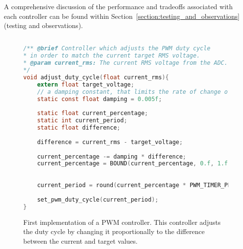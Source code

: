 A comprehensive discussion of the performance and tradeoffs associated with each controller can be found within Section~\ref{section:testing_and_observations} (testing and observations).

\begin{figure}[h]
\begin{lstlisting}[language=C, frame=single, basicstyle=\small, tabsize=2]

/** @brief Controller which adjusts the PWM duty cycle
* in order to match the current target RMS voltage.
* @param current_rms: The current RMS voltage from the ADC.
*/
void adjust_duty_cycle(float current_rms){ 
	extern float target_voltage;
	// a damping constant, that limits the rate of change of the percentage.
	static const float damping = 0.005f;
	
	static float current_percentage;
	static int current_period;
	static float difference;
	
	difference = current_rms - target_voltage;
	
	current_percentage -= damping * difference;
	current_percentage = BOUND(current_percentage, 0.f, 1.f);
	
	
	current_period = round(current_percentage * PWM_TIMER_PERIOD);
	
	set_pwm_duty_cycle(current_period);
}
\end{lstlisting}
\caption{\label{fig:pwm_controller_1_logic} First implementation of a PWM controller. This controller adjusts the duty cycle by changing it proportionally to the difference between the current and target values.}
\end{figure}


